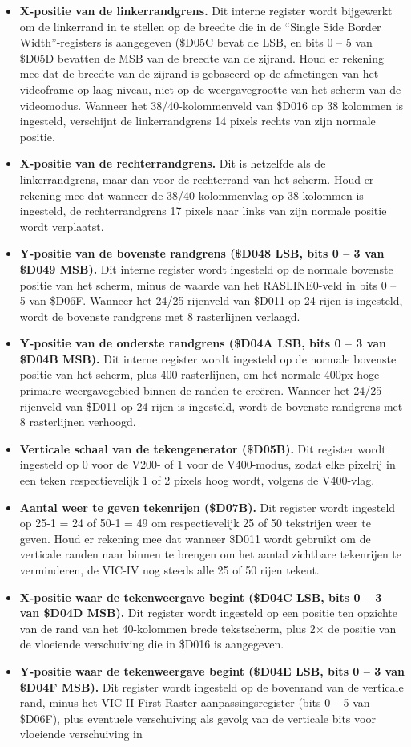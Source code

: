 \begin{itemize}
\item {\bf X-positie van de linkerrandgrens.}  Dit interne register wordt bijgewerkt om de linkerrand in te stellen op de breedte die in de ``Single Side Border Width''-registers is aangegeven (\$D05C bevat de LSB, en bits 0 -- 5 van \$D05D bevatten de MSB van de breedte van de zijrand.  Houd er rekening mee dat de breedte van de zijrand is gebaseerd op de afmetingen van het videoframe op laag niveau, niet op de weergavegrootte van het scherm van de videomodus. Wanneer het 38/40-kolommenveld van \$D016 op 38 kolommen is ingesteld, verschijnt de linkerrandgrens 14 pixels rechts van zijn normale positie.\item {\bf X-positie van de rechterrandgrens.} Dit is hetzelfde als de linkerrandgrens, maar dan voor de rechterrand van het scherm. Houd er rekening mee dat wanneer de 38/40-kolommenvlag op 38 kolommen is ingesteld, de rechterrandgrens 17 pixels naar links van zijn normale positie wordt verplaatst.\item {\bf Y-positie van de bovenste randgrens (\$D048 LSB, bits 0 -- 3 van \$D049 MSB).} Dit interne register wordt ingesteld op de normale bovenste positie van het scherm, minus de waarde van het RASLINE0-veld in bits 0 -- 5 van \$D06F.  Wanneer het 24/25-rijenveld van \$D011 op 24 rijen is ingesteld, wordt de bovenste randgrens met 8 rasterlijnen verlaagd.\item {\bf Y-positie van de onderste randgrens (\$D04A LSB, bits 0 -- 3 van \$D04B MSB).} Dit interne register wordt ingesteld op de normale bovenste positie van het scherm, plus 400 rasterlijnen, om het normale 400px hoge primaire weergavegebied binnen de randen te creëren. Wanneer het 24/25-rijenveld van \$D011 op 24 rijen is ingesteld, wordt de bovenste randgrens met 8 rasterlijnen verhoogd.\item {\bf Verticale schaal van de tekengenerator (\$D05B).} Dit register wordt ingesteld op 0 voor de V200- of 1 voor de V400-modus, zodat elke pixelrij in een teken respectievelijk 1 of 2 pixels hoog wordt, volgens de V400-vlag.\item {\bf Aantal weer te geven tekenrijen (\$D07B).} Dit register wordt ingesteld op 25-1 = 24 of 50-1 = 49 om respectievelijk 25 of 50 tekstrijen weer te geven.  Houd er rekening mee dat wanneer \$D011 wordt gebruikt om de verticale randen naar binnen te brengen om het aantal zichtbare tekenrijen te verminderen, de VIC-IV nog steeds alle 25 of 50 rijen tekent.\item {\bf X-positie waar de tekenweergave begint (\$D04C LSB, bits 0 -- 3 van \$D04D MSB).}  Dit register wordt ingesteld op een positie ten opzichte van de rand van het 40-kolommen brede tekstscherm, plus 2$\times$ de positie van de vloeiende verschuiving die in \$D016 is aangegeven.\item {\bf Y-positie waar de tekenweergave begint (\$D04E LSB, bits 0 -- 3 van \$D04F MSB).}  Dit register wordt ingesteld op de bovenrand van de verticale rand, minus het VIC-II First Raster-aanpassingsregister (bits 0 -- 5 van \$D06F), plus eventuele verschuiving als gevolg van de verticale bits voor vloeiende verschuiving in 
\end{itemize}
